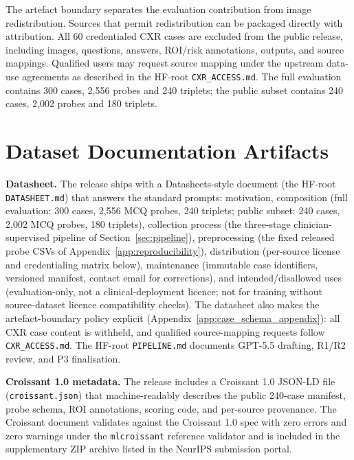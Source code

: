 \documentclass{article}
\begin{document}
The artefact boundary separates the evaluation contribution from image redistribution. Sources that permit redistribution can be packaged directly with attribution. All 60 credentialed CXR cases are excluded from the public release, including images, questions, answers, ROI/risk annotations, outputs, and source mappings. Qualified users may request source mapping under the upstream data-use agreements as described in the HF-root \texttt{CXR\_ACCESS.md}. The full evaluation contains 300 cases, 2{,}556 probes and 240 triplets; the public subset contains 240 cases, 2{,}002 probes and 180 triplets.


\section{Dataset Documentation Artifacts}
\label{app:documentation}


\textbf{Datasheet.} The release ships with a Datasheets-style document \cite{gebru2021datasheets,pushkarna2022datacards} (the HF-root \texttt{DATASHEET.md}) that answers the standard prompts: motivation, composition (full evaluation: 300 cases, 2{,}556 MCQ probes, 240 triplets; public subset: 240 cases, 2{,}002 MCQ probes, 180 triplets), collection process (the three-stage clinician-supervised pipeline of Section~\ref{sec:pipeline}), preprocessing (the fixed released probe CSVs of Appendix~\ref{app:reproducibility}), distribution (per-source license and credentialing matrix below), maintenance (immutable case identifiers, versioned manifest, contact email for corrections), and intended/disallowed uses (evaluation-only, not a clinical-deployment licence; not for training without source-dataset licence compatibility checks). The datasheet also makes the artefact-boundary policy explicit (Appendix~\ref{app:case_schema_appendix}): all CXR case content is withheld, and qualified source-mapping requests follow \texttt{CXR\_ACCESS.md}. The HF-root \texttt{PIPELINE.md} documents GPT-5.5 drafting, R1/R2 review, and P3 finalisation.

\textbf{Croissant 1.0 metadata.} The release includes a Croissant 1.0 \cite{mlcommons2024croissant} JSON-LD file (\texttt{croissant.json}) that machine-readably describes the public 240-case manifest, probe schema, ROI annotations, scoring code, and per-source provenance. The Croissant document validates against the Croissant 1.0 spec with zero errors and zero warnings under the \texttt{mlcroissant} reference validator and is included in the supplementary ZIP archive listed in the NeurIPS submission portal.
\end{document}
